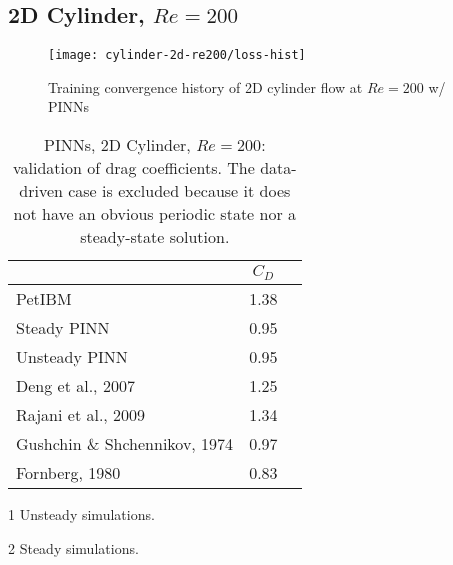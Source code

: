 \lipsum[1]

\subsection{2D Cylinder, $Re=\num{200}$}

\lipsum[1]

\begin{figure}[!hbt]
    \centering%
    \texttt{[image: cylinder-2d-re200/loss-hist]}%
    \caption{%
        Training convergence history of 2D cylinder flow at $Re=\num{200}$ w/ PINNs
    }
    \label{fig:cylinder-re200-pinn-loss}%
\end{figure}

\lipsum[1]

\begin{table}[hbt!]
    \centering%
    \begin{threeparttable}[b]
        \begin{tabular}{lcc}
            \toprule
            & $C_D$ \\
            \midrule
            PetIBM & 1.38   \\
            Steady PINN & 0.95 \\
            Unsteady PINN & 0.95 \\
            Deng et al., 2007\cite{deng_hydrodynamic_2007}\tnote{1} & 1.25 \\
            Rajani et al., 2009\cite{Rajani2009}\tnote{1} & 1.34 \\
            Gushchin \& Shchennikov, 1974\cite{gushchin_numerical_1974}\tnote{2} & 0.97 \\
            Fornberg, 1980\cite{fornberg_numerical_1980}\tnote{2} & 0.83 \\
            \bottomrule
        \end{tabular}%
        \begin{tablenotes}
            \footnotesize
            \item [1] Unsteady simulations.
            \item [2] Steady simulations.
        \end{tablenotes}
        \caption{%
            PINNs, 2D Cylinder, $Re=200$: validation of drag coefficients.%
            The data-driven case is excluded because it does not have an obvious periodic state nor a steady-state solution.%
        }%
        \label{table:cylinder-2d-re200-cd}
    \end{threeparttable}
\end{table}%

